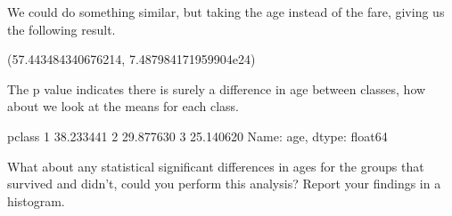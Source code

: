 \documentclass[letterpaper,10pt,english]{jupyterBook}
\begin{document}
\noindent{}

\sphinxAtStartPar
We could do something similar, but taking the age instead of the fare, giving us the following result.

\begin{sphinxVerbatim}[commandchars=\\\{\}]
   
    \PYG{p}{[}\PYG{p}{]}
    \PYG{p}{[}\PYG{p}{]}
    \PYG{p}{[}\PYG{p}{]}
 
\end{sphinxVerbatim}

\begin{sphinxVerbatim}[commandchars=\\\{\}]
(57.443484340676214, 7.487984171959904e\PYGZhy{}24)
\end{sphinxVerbatim}

\sphinxAtStartPar
The p value indicates there is surely a difference in age between classes, how about we look at the means for each class.

\begin{sphinxVerbatim}[commandchars=\\\{\}]
\end{sphinxVerbatim}

\begin{sphinxVerbatim}[commandchars=\\\{\}]
pclass
1    38.233441
2    29.877630
3    25.140620
Name: age, dtype: float64
\end{sphinxVerbatim}

\sphinxAtStartPar
What about any statistical significant differences in ages for the groups that survived and didn’t, could you perform this analysis?
Report your findings in a histogram.
\end{document}
